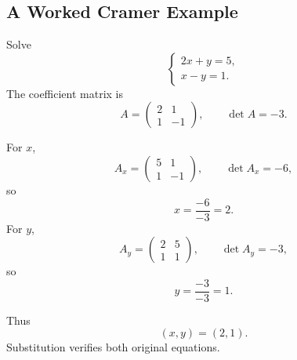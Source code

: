 \subsection{A Worked Cramer Example}

Solve
\[
\begin{cases}
2x+y=5,\\
x-y=1.
\end{cases}
\]
The coefficient matrix is
\[
A=\begin{pmatrix}2&1\\1&-1\end{pmatrix},
\qquad
\det A=-3.
\]

\begin{derivationbox}
For $x$,
\[
A_x=\begin{pmatrix}5&1\\1&-1\end{pmatrix},
\qquad
\det A_x=-6,
\]
so
\[
x=\frac{-6}{-3}=2.
\]
For $y$,
\[
A_y=\begin{pmatrix}2&5\\1&1\end{pmatrix},
\qquad
\det A_y=-3,
\]
so
\[
y=\frac{-3}{-3}=1.
\]
\end{derivationbox}

Thus
\[
\boxed{(x,y)=(2,1)}.
\]
Substitution verifies both original equations.
